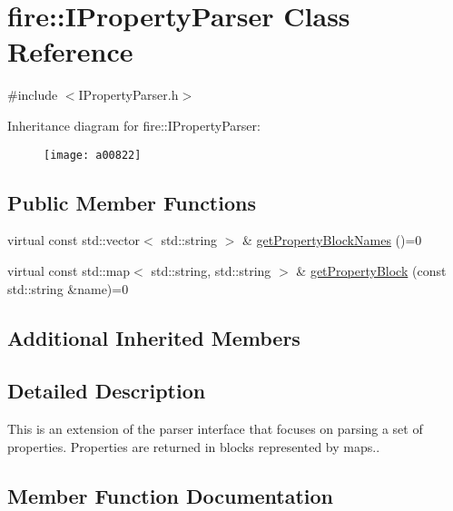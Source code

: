 \hypertarget{a00822}{}\section{fire\+:\+:I\+Property\+Parser Class Reference}
\label{a00822}


{\ttfamily \#include $<$I\+Property\+Parser.\+h$>$}

Inheritance diagram for fire\+:\+:I\+Property\+Parser\+:\begin{figure}[H]
\begin{center}
\leavevmode
\texttt{[image: a00822]}
\end{center}
\end{figure}
\subsection*{Public Member Functions}
\begin{DoxyCompactItemize}
\item 
virtual const std\+::vector$<$ std\+::string $>$ \& \hyperlink{a00822_a34602687f9d1affac7bd842102d4a6aa}{get\+Property\+Block\+Names} ()=0
\item 
virtual const std\+::map$<$ std\+::string, std\+::string $>$ \& \hyperlink{a00822_a34201371cb36dd09e96a66242ececb86}{get\+Property\+Block} (const std\+::string \&name)=0
\end{DoxyCompactItemize}
\subsection*{Additional Inherited Members}


\subsection{Detailed Description}
This is an extension of the parser interface that focuses on parsing a set of properties. Properties are returned in blocks represented by maps.. 

\subsection{Member Function Documentation}
\mbox{\label{a00822_a34201371cb36dd09e96a66242ececb86}} 
